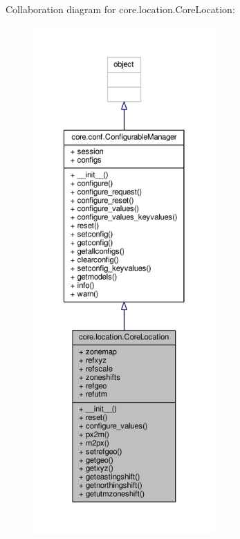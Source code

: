 Collaboration diagram for core.\+location.\+Core\+Location\+:
\nopagebreak
\begin{figure}[H]
\begin{center}
\leavevmode
\includegraphics[height=550pt]{classcore_1_1location_1_1_core_location__coll__graph}
\end{center}
\end{figure}
